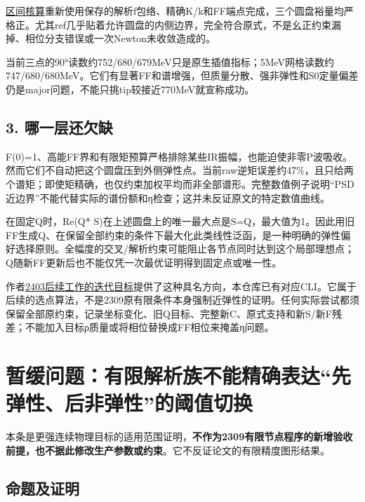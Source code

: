\documentclass[
  10pt,
  a4paper,
]{article}
\begin{document}
\href{../../../GRAM_DISK_DIAGNOSTIC.json}{区间核算}重新使用保存的解析f包络、精确K/k和FF端点完成，三个圆盘裕量均严格正。尤其ref几乎贴着允许圆盘的内侧边界，完全符合原式，不是幺正约束漏掉、相位分支错误或一次Newton未收敛造成的。

当前三点的90°读数约752/680/679MeV只是原生插值指标；5MeV网格读数约747/680/680MeV。它们有显著FF和谱增强，但质量分散、强非弹性和S0定量偏差仍是major问题，不能只挑tip较接近770MeV就宣称成功。

\subsection{3. 哪一层还欠缺}\label{ux54eaux4e00ux5c42ux8fd8ux6b20ux7f3a}

F(0)=1、高能FF界和有限矩预算严格排除某些IR振幅，也能迫使非零P波吸收。然而它们不自动把这个圆盘压到外侧弹性点。当前raw逆矩误差约47\%，且只给两个谱矩；即使矩精确，也仅约束加权平均而非全部谱形。完整数值例子说明``PSD近边界''不能代替实际的谱份额和η检查；这并未反证原文的特定数值曲线。

在固定Q时，Re(Q*
S)在上述圆盘上的唯一最大点是S=Q，最大值为1。因此用旧FF生成Q、在保留全部约束的条件下最大化此类线性泛函，是一种明确的弹性偏好选择原则。全幅度的交叉/解析约束可能阻止各节点同时达到这个局部理想点；Q随新FF更新后也不能仅凭一次最优证明得到固定点或唯一性。

作者\href{https://arxiv.org/html/2403.10772v4}{2403后续工作的迭代目标}提供了这种具名方向，本仓库已有对应CLI。它属于后续的选点算法，不是2309原有限条件本身强制近弹性的证明。任何实际尝试都须保留全部原约束，记录坐标变化、旧Q目标、完整新C、原式支持和新S/新F残差；不能加入目标ρ质量或将相位替换成FF相位来掩盖η问题。

\newpage

\section{暂缓问题：有限解析族不能精确表达``先弹性、后非弹性''的阈值切换}\label{ux6682ux7f13ux95eeux9898ux6709ux9650ux89e3ux6790ux65cfux4e0dux80fdux7cbeux786eux8868ux8fbeux5148ux5f39ux6027ux540eux975eux5f39ux6027ux7684ux9608ux503cux5207ux6362}

本条是更强连续物理目标的适用范围证明，\textbf{不作为2309有限节点程序的新增验收前提，也不据此修改生产参数或约束}。它不反证论文的有限精度图形结果。

\subsection{命题及证明}\label{ux547dux9898ux53caux8bc1ux660e}
\end{document}
